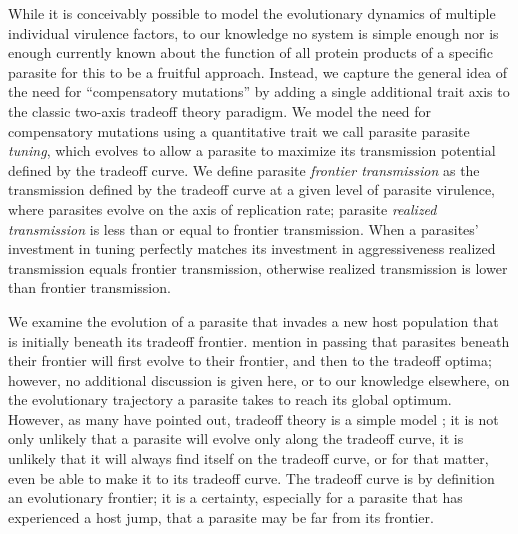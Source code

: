 While it is conceivably possible to model the evolutionary dynamics of multiple individual virulence factors, to our knowledge no system is simple enough nor is enough currently known about the function of all protein products of a specific parasite for this to be a fruitful approach. Instead, we capture the general idea of the need for ``compensatory mutations'' by adding a single additional trait axis to the classic two-axis tradeoff theory paradigm. We model the need for compensatory mutations using a quantitative trait we call parasite parasite \emph{tuning}, which evolves to allow a parasite to maximize its transmission potential defined by the tradeoff curve. We define parasite \emph{frontier transmission} as the transmission defined by the tradeoff curve at a given level of parasite virulence, where parasites evolve on the axis of replication rate; parasite \emph{realized transmission} is less than or equal to frontier transmission. When a parasites' investment in tuning perfectly matches its investment in aggressiveness realized transmission equals frontier transmission, otherwise realized transmission is lower than frontier transmission.  

We examine the evolution of a parasite that invades a new host population that is initially beneath its tradeoff frontier. \citet{Alizonetal.2009} mention in passing that parasites beneath their frontier will first evolve to their frontier, and then to the tradeoff optima; however, no additional discussion is given here, or to our knowledge elsewhere, on the evolutionary trajectory a parasite takes to reach its global optimum. However, as many have pointed out, tradeoff theory is a simple model \citep{BullandLauring2014, AlizonandMichalakis2015, Cressleretal.2016}; it is not only unlikely that a parasite will evolve only along the tradeoff curve, it is unlikely that it will always find itself on the tradeoff curve, or for that matter, even be able to make it to its tradeoff curve. The tradeoff curve is by definition an evolutionary frontier; it is a certainty, especially for a parasite that has experienced a host jump, that a parasite may be far from its frontier.


